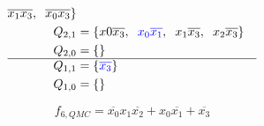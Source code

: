 \documentclass[a4paper]{article}
\begin{document}
\begin{enumerate}[label=\alph*)]
\begin{enumerate}[label=\roman*)]
\begin{align*}
			\overline{x_1x_3},\hspace{0.2cm}
			\overline{x_0x_3}
			\}\\
			Q_{2,1} &= \{
			x0\overline{x_3},\hspace{0.2cm}
			\textcolor{blue}{x_0\overline{x_1}},\hspace{0.2cm}
			x_1\overline{x_3},\hspace{0.2cm}
			x_2\overline{x_3}
			\}\\
			Q_{2,0} &= \{ \}\\
			\hline
			Q_{1,1} &= \{\textcolor{blue}{\overline{x_3}} \}\\
			Q_{1,0} &= \{\}\\
		\end{align*}
		
		\begin{equation*}
		f_{6, QMC} = \overline{x_0}x_1\overline{x_2} + x_0\overline{x_1} + \overline{x_3}
		\end{equation*}
	\end{enumerate}
\end{enumerate}
\end{document}
